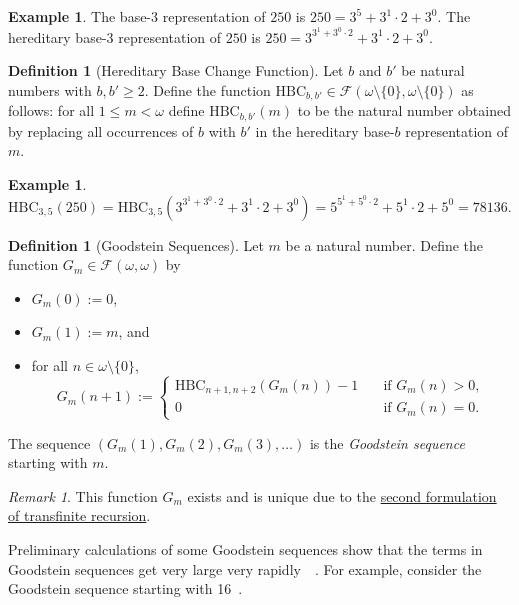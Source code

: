 \documentclass[a4paper,11pt]{article}
\theoremstyle{plain}
\theoremstyle{definition}
\newtheorem{defn}[thm]{Definition}
\newtheorem{eg}[thm]{Example}
\theoremstyle{remark}
\newtheorem*{rem}{Remark}
\begin{document}
\begin{eg}
The base-$3$ representation of $250$ is $250 = 3^5 + 3^1 \cdot 2 + 3^0$. The hereditary base-$3$ representation of $250$ is $250 = 3^{3^1 + 3^0 \cdot 2} + 3^1 \cdot 2 + 3^0$.
\end{eg}

\begin{defn}[Hereditary Base Change Function]
Let $b$ and $b'$ be natural numbers with $b,b' \geq 2$. Define the function $\mathrm{HBC}_{b, b'} \in \mathscr F(\omega\setminus\{0\}, \omega\setminus \{0\})$ as follows: for all $1 \leq m < \omega$ define $\mathrm{HBC}_{b,b'}(m)$ to be the natural number obtained by replacing all occurrences of $b$ with $b'$ in the hereditary base-$b$ representation of $m$.
\end{defn}

\begin{eg}
$\mathrm{HBC}_{3, 5}(250) = \mathrm{HBC}_{3,5}\left(3^{3^1 + 3^0 \cdot 2} + 3^1 \cdot 2 + 3^0 \right) = 5^{5^1 + 5^0 \cdot 2} + 5^1 \cdot 2 + 5^0 = 78136$.
\end{eg}

\begin{defn}[Goodstein Sequences]
Let $m$ be a natural number. Define the function $G_m \in \mathscr F(\omega, \omega)$ by 
\begin{itemize}
\item $G_m(0) := 0$,
\item $G_m(1) := m$, and 
\item for all $n \in \omega\setminus\{0\}$,
\[G_m(n+1) := \begin{cases}
\mathrm{HBC}_{n+1, n+2}(G_m(n)) - 1 &\quad \text{if } G_m(n) > 0, \\
0 &\quad \text{if } G_m(n) = 0.
\end{cases}\]
\end{itemize}
The sequence $(G_m(1), G_m(2), G_m(3), \dots)$ is the \textit{Goodstein sequence} starting with $m$.
\end{defn}
\begin{rem}
This function $G_m$ exists and is unique due to the \hyperref[thm:Trecursion2]{second formulation of transfinite recursion}.
\end{rem}

Preliminary calculations of some Goodstein sequences show that the terms in Goodstein sequences get very large very rapidly~\citep{GoodsteinFunction}~\citep{FastGrowingFunctions}. For example, consider the Goodstein sequence starting with 16~\citep{GoodsteinEg}.
\end{document}
